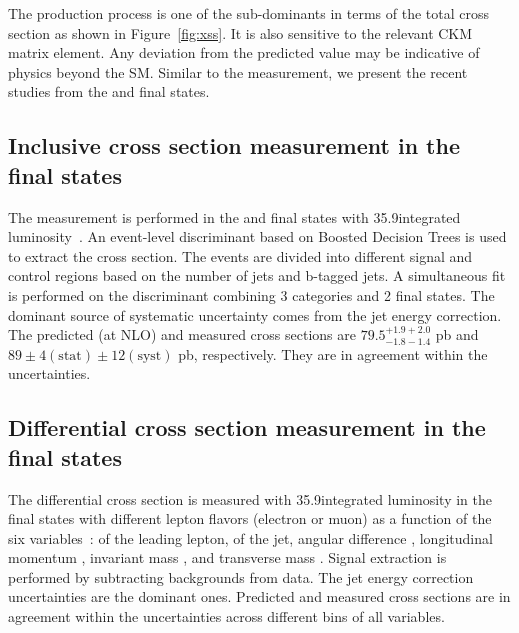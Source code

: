  The \tW production process is one of the sub-dominants in terms of the total cross section as 
 shown in Figure~\ref{fig:xss}. It is also sensitive to the relevant CKM matrix element. 
 Any deviation from the predicted value may be indicative of physics beyond the SM. Similar to the 
 \ttbar measurement, we present the recent studies from the \ljets and \dilep final states.

 \subsection{Inclusive cross section measurement in the \texorpdfstring{\ljets}{ljets} final states}
 The measurement is performed in the \ejets and \mujets final states with 35.9\fbinv integrated
 luminosity~\cite{CMS-PAS-TOP-20-002}. An event-level discriminant based on Boosted Decision Trees 
 is used to extract the cross section. The events are divided into different signal and control 
 regions based on the number of jets and b-tagged jets. A simultaneous fit is performed on the
 discriminant combining 3 categories and 2 final states. The dominant source of systematic 
 uncertainty comes from the jet energy correction. The predicted (at NLO) and 
 measured cross sections are $79.5^{+1.9+2.0}_{-1.8-1.4}$ pb and 
 $89 \pm 4 (\text{stat}) \pm 12 (\text{syst})$ pb, respectively. They are in agreement within the
 uncertainties.

 \subsection{Differential cross section measurement in the \texorpdfstring{\dilep}{dilep} final states}
 The differential cross section is measured with 35.9\fbinv integrated luminosity in the \dilep final
 states with different lepton flavors (electron or muon) as a function of the six 
 variables~\cite{CMS-PAS-TOP-19-003}: \pt of the leading lepton, \pt of the jet, angular difference
 \deltaPhiVar, longitudinal momentum \pzvar, invariant mass \invmassvar, and transverse mass 
 \transmassvar. Signal extraction is performed by subtracting backgrounds from data. The jet energy 
 correction uncertainties are the dominant ones. Predicted and measured cross sections are in 
 agreement within the uncertainties across different bins of all variables.
